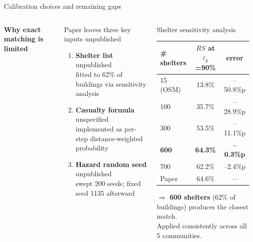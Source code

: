\documentclass[aspectratio=169, xcolor=table]{beamer}
\newcommand{\keyterm}[1]{\textbf{\textcolor{highlightblue}{#1}}}
\begin{document}
\begin{frame}[t]{Calibration choices and remaining gaps}
\footnotesize

\begin{columns}[T,onlytextwidth]
\textbf{Why exact matching is limited}
\vspace{0.2em}
\begin{block}{\small Paper leaves three key inputs unpublished}
\scriptsize
\vspace{0.2em}
\begin{enumerate}\itemsep0.35em
  \item \keyterm{Shelter list} unpublished\\
        fitted to 62\% of buildings via sensitivity analysis
  \item \keyterm{Casualty formula} unspecified\\
        implemented as per-step distance-weighted probability
  \item \keyterm{Hazard random seed} unpublished\\
        swept 200 seeds; fixed seed 1135 afterward
\end{enumerate}
\end{block}

\vspace{0.4em}

\begin{alertblock}{\small Shelter sensitivity analysis}
\scriptsize
\begin{tabular}{lcc}
\toprule
\# shelters & $RS$ at $\varepsilon_p$=90\% & error \\
\midrule
15 (OSM)  & 13.8\% & --50.8\%p \\
100       & 35.7\% & --28.9\%p \\
300       & 53.5\% & --11.1\%p \\
\textbf{600} & \textbf{64.3\%} & \textbf{--0.3\%p} \\
700       & 62.2\% & --2.4\%p \\
\midrule
Paper     & 64.6\% & --- \\
\bottomrule
\end{tabular}

\vspace{0.4em}
$\Rightarrow$ \textbf{600 shelters} (62\% of buildings) produces the closest match.\\
Applied consistently across all 5 communities.
\end{alertblock}
\end{columns}
\end{frame}
\end{document}
